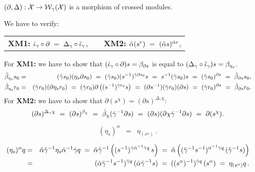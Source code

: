 \begin{lem}
$(\partial,\Delta) : \mathcal{X} \to \mathcal{W}_{\gamma}(\mathcal{X}) $ is a morphism of crossed modules.
\end{lem} 
\begin{pf}
We have to verify: 
\begin{center} 
\begin{tabular}{ c c c  } 
\textbf{XM1:} \quad $\dot{\iota}_{\gamma} \circ \partial ~=~ \Delta_{\gamma} \circ \ddot{\iota}_{\gamma}$,  & & 
\textbf{XM2:} \quad $\ddot{\alpha}(s^r) ~=~ (\ddot{\alpha}  s)^{\dot{\alpha} r}$, 
\end{tabular} 
\end{center} 
\noindent 
For \textbf{XM1:} we have to show that $(\dot{\iota}_{\gamma} \circ \partial)s = \beta_{\partial s}$ 
is equal to $(\Delta_{\gamma} \circ \ddot{\iota}_{\gamma})s = \beta_{\eta_s}$. 
\begin{eqnarray*}
\ddot{\beta}_{\eta_s}s_0 
  & = &  (\ddot{\gamma} s_0)(\eta_s \partial s_0) 
             ~=~  (\ddot{\gamma} s_0)(s^{-1})^{\dot{\gamma} \partial s_0}s 
             ~=~  s^{-1} (\ddot{\gamma} s_0) s 
             ~=~ (\ddot{\gamma} s_0)^{\partial s} 
             ~=~  \ddot{\beta}_{\partial s} s_0, \\ 
\dot{\beta}_{\eta_s}r_0 
  & = &  (\dot{\gamma} r_0)(\partial \eta_s r_0) 
             ~=~  (\dot{\gamma} r_0)\partial \left( (s^{-1})^{\dot{\gamma} r_0} s \right) 
             ~=~  (\partial s^{-1})(\dot{\gamma} r_0)(\partial s) 
             ~=~  (\dot{\gamma} r_0)^{\partial s} 
             ~=~  \dot{\beta}_{\partial s} r_0. 
\end{eqnarray*} 
For \textbf{XM2:} we have to show that $\partial(s^{\chi}) = (\partial s)^{\Delta_{\gamma}\chi}$: 
$$
(\partial s)^{\Delta_{\gamma}\chi} 
~=~ (\partial s)^{\beta_{\chi}} 
~=~ \dot{\beta}_{\chi}(\dot{\gamma}^{-1} \partial s) 
~=~ (\partial s)(\partial \chi \dot{\gamma}^{-1} \partial s ) 
~=~ \partial(s^{\chi}). 
$$
\end{pf} 

\begin{lem}
$$
(\eta_s)^{\alpha} \;\;=\;\; \eta_{(s^{\alpha})}~.
$$
\end{lem}
\begin{pf} 
\begin{eqnarray*}
(\eta_s)^{\alpha}q 
  & = &  \ddot{\alpha} \ddot{\gamma}^{-1} \eta_s \dot{\alpha}^{-1} \dot{\gamma} q  
  \;=\;  \ddot{\alpha} \ddot{\gamma}^{-1} 
           \left( (s^{-1})^{\dot{\gamma}\dot{\alpha}^{-1}\dot{\gamma} q}\,s \right) 
  \;=\;  \ddot{\alpha}\left( (\ddot{\gamma}^{-1}s^{-1})^{\dot{\alpha}^{-1}\dot{\gamma} q}\,(\ddot{\gamma}^{-1}s)\right) \\ 
  & = &  (\ddot{\alpha} \ddot{\gamma}^{-1} s^{-1})^{\dot{\gamma} q}\,(\ddot{\alpha} \ddot{\gamma}^{-1}s)  
  \;=\;  ((s^{\alpha})^{-1})^{\dot{\gamma} q}\,(s^{\alpha}) 
  \;=\;  \eta_{(s^{\alpha})}q \,. 
\end{eqnarray*}
\end{pf}

